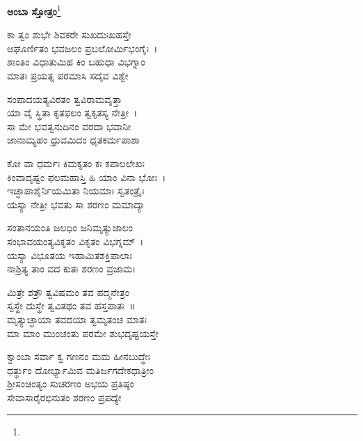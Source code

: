 \begin{center}
\textbf{ಅಂಬಾ ಸ್ತೋತ್ರಂ}\footnote{}
\end{center}

\begin{myquote}
ಕಾ ತ್ವಂ ಶುಭೇ ಶಿವಕರೇ ಸುಖದುಃಖಹಸ್ತೇ\\ಆಘೂರ್ಣಿತಂ ಭವಜಲಂ ಪ್ರಬಲೋರ್ಮಿಭಂಗೈಃ~।\\ಶಾಂತಿಂ ವಿಧಾತುಮಿಹ ಕಿಂ ಬಹುಧಾ ವಿಭಗ್ನಾಂ\\
ಮಾತಃ ಪ್ರಯತ್ನ ಪರಮಾಸಿ ಸದೈವ ವಿಶ್ವೇ
\end{myquote}


\begin{myquote}
ಸಂಪಾದಯತ್ಯವಿರತಂ ತ್ವವಿರಾಮವೃತ್ತಾ\\ಯಾ ವೈ ಸ್ಥಿತಾ ಕೃತಫಲಂ ತ್ವಕೃತಸ್ಯ ನೇತ್ರೀ~।\\
ಸಾ ಮೇ ಭವತ್ವನುದಿನಂ ವರದಾ ಭವಾನೀ\\ಜಾನಾಮ್ಯಹಂ ಧ್ರುವಮಿದಂ ಧೃತಕರ್ಮಪಾಶಾ
\end{myquote}


\begin{myquote}
ಕೋ ವಾ ಧರ್ಮಃ ಕಿಮಕೃತಂ ಕಃ ಕಪಾಲಲೇಖಃ\\ಕಿಂವಾದೃಷ್ಟಂ ಫಲಮಹಾಸ್ತಿ ಹಿ ಯಾಂ ವಿನಾ ಭೋಃ~।\\
ಇಚ್ಛಾಪಾಶೈರ್ನಿಯಮಿತಾ ನಿಯಮಾಃ ಸ್ವತಂತ್ರೈಃ\\ಯಸ್ಯಾ ನೇತ್ರೀ ಭವತು ಸಾ ಶರಣಂ ಮಮಾದ್ಯಾ
\end{myquote}


\begin{myquote}
ಸಂತಾನಯಂತಿ ಜಲಧಿಂ ಜನಿಮೃತ್ಯುಜಾಲಂ\\ಸಂಭಾವಯಂತ್ಯವಿಕೃತಂ ವಿಕೃತಂ ವಿಭಗ್ನಮ್~।\\
ಯಸ್ಯಾ ವಿಭೂತಯ ಇಹಾಮಿತಶಕ್ತಿಪಾಲಾಃ\\ನಾಶ್ರಿತ್ಯ ತಾಂ ವದ ಕುತಃ ಶರಣಂ ವ್ರಜಾಮಃ
\end{myquote}


\begin{myquote}
ಮಿತ್ರೇ ಶತ್ರೌ ತ್ವವಿಷಮಂ ತವ ಪದ್ಮನೇತ್ರಂ\\ಸ್ವಸ್ಥೇ ದುಸ್ಥೇ ತ್ವವಿತಥಂ ತವ ಹಸ್ತಪಾತಃ~॥\\ಮೃತ್ಯುಚ್ಛಾಯಾ ತವದಯಾ ತ್ವಮೃತಂಚ ಮಾತಃ\\ಮಾ ಮಾಂ ಮುಂಚಂತು ಪರಮೇ ಶುಭದೃಷ್ಟಯಸ್ತೇ
\end{myquote}


\begin{myquote}
ಕ್ವಾಂಬಾ ಸರ್ವಾ ಕ್ವ ಗಣನಂ ಮಮ ಹೀನಬುದ್ಧೇಃ\\ಧರ್ತ್ಥುಂ ದೋರ್ಭ್ಯಾಮಿವ ಮತಿರ್ಜಗದೇಕಧಾತ್ರೀಂ\\ಶ‍್ರೀಸಂಚಿಂತ್ಯಂ ಸುಚರಣಂ ಅಭಯ ಪ್ರತಿಷ್ಠಂ\\ಸೇವಾಸಾರೈರಭಿನುತಂ ಶರಣಂ ಪ್ರಪದ್ಯೇ
\end{myquote}

